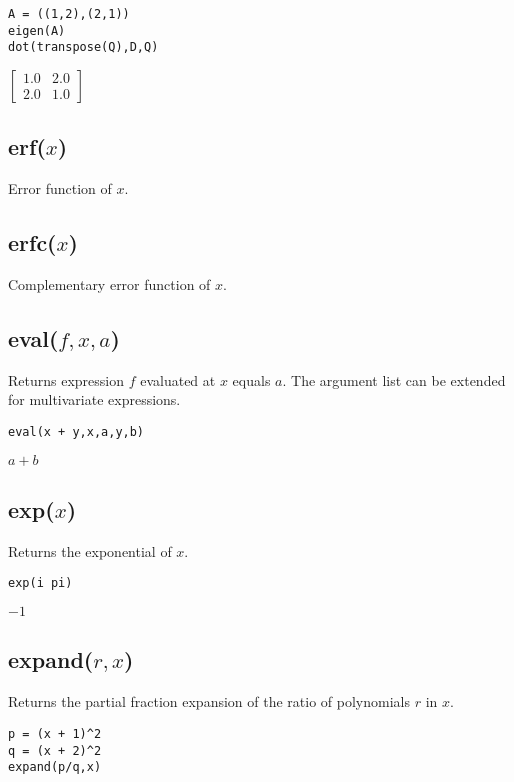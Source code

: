 {\color{blue}
\begin{verbatim}
A = ((1,2),(2,1))
eigen(A)
dot(transpose(Q),D,Q)
\end{verbatim}
}

\noindent
$\displaystyle \begin{bmatrix}
1.0 & 2.0\\
2.0 & 1.0
\end{bmatrix}
$

\subsection*{erf($x$)}

Error function of $x$.

\subsection*{erfc($x$)}

Complementary error function of $x$.

\subsection*{eval($f,x,a$)}

Returns expression $f$ evaluated at $x$ equals $a$.
The argument list can be extended for multivariate expressions.

{\color{blue}
\begin{verbatim}
eval(x + y,x,a,y,b)
\end{verbatim}
}

\noindent
$a+b$

\subsection*{exp($x$)}

Returns the exponential of $x$.

{\color{blue}
\begin{verbatim}
exp(i pi)
\end{verbatim}
}

\noindent
$-1$

\subsection*{expand($r,x$)}

Returns the partial fraction expansion of the ratio of polynomials $r$ in $x$.

{\color{blue}
\begin{verbatim}
p = (x + 1)^2
q = (x + 2)^2
expand(p/q,x)
\end{verbatim}
}

